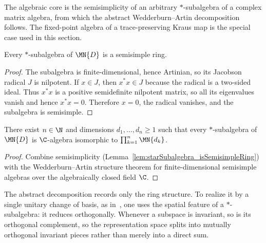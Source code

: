 The algebraic core is the semisimplicity of an arbitrary $*$-subalgebra of a
complex matrix algebra, from which the abstract Wedderburn--Artin
decomposition follows. The fixed-point algebra of a trace-preserving Kraus
map is the special case used in this section.

\begin{lemma}%
    \label{lem:starSubalgebra_isSemisimpleRing}
    \leanok
    Every $*$-subalgebra of $\MN{D}$ is a semisimple ring.
\end{lemma}

\begin{proof}
    \leanok
    The subalgebra is finite-dimensional, hence Artinian, so its Jacobson
    radical $J$ is nilpotent. If $x\in J$, then $x^*x\in J$ because the
    radical is a two-sided ideal. Thus $x^*x$ is a positive semidefinite
    nilpotent matrix, so all its eigenvalues vanish and hence $x^*x=0$.
    Therefore $x=0$, the radical vanishes, and the subalgebra is
    semisimple.
\end{proof}

\begin{theorem}%
    \label{thm:starSubalgebra_wedderburnArtin}
    \leanok
    There exist $n\in\N$ and dimensions $d_1,\ldots,d_n\geq1$ such that
    every $*$-subalgebra of $\MN{D}$ is $\C$-algebra isomorphic to
    $\prod_{k=1}^n\MN{d_k}$.
\end{theorem}

\begin{proof}
    \leanok
    Combine semisimplicity
    (Lemma~\ref{lem:starSubalgebra_isSemisimpleRing}) with the
    Wedderburn--Artin structure theorem for finite-dimensional semisimple
    algebras over the algebraically closed field $\C$.
\end{proof}

The abstract decomposition records only the ring structure. To realize it by
a single unitary change of basis, as
in~\cite[Theorem~6.14]{Wolf2012Quantum}, one uses the spatial feature of a
$*$-subalgebra: it reduces orthogonally. Whenever a subspace is invariant,
so is its orthogonal complement, so the representation space splits into
mutually orthogonal invariant pieces rather than merely into a direct sum.

